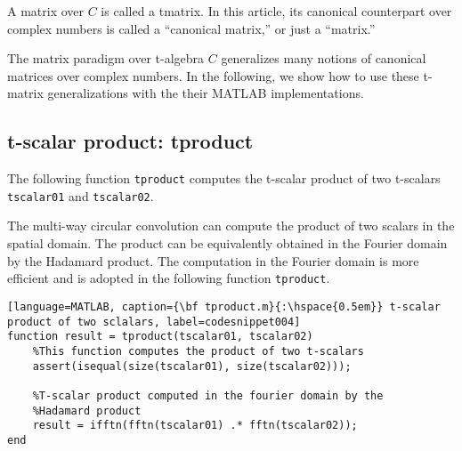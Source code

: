 \documentclass[12pt,reqno]{amsart}
\numberwithin{equation}{section}
\numberwithin{figure}{section}
\numberwithin{table}{section}
\theoremstyle{definition}
\begin{document}
\lstset{style=mystyle}

\renewcommand{\lstlistingname}{function}

A matrix over $C$ is called a tmatrix. In this article, its canonical counterpart over complex numbers is called a ``canonical matrix,'' or just a ``matrix.''  

The matrix paradigm over t-algebra $C$ generalizes many notions of canonical matrices over complex numbers. 
In the following, we show how to use these t-matrix generalizations with the their MATLAB implementations.


\subsection{{\color{blue}\sc t-scalar product}: {\color{blue}tproduct}}
The following function {\tt tproduct} computes the t-scalar product of two t-scalars {\tt tscalar01} and {\tt tscalar02}. 


The multi-way circular convolution can compute the product of two scalars in the spatial domain. The product can be equivalently obtained in the Fourier domain by the Hadamard product.  The computation in the Fourier domain is more efficient and is adopted in the following function 
{\tt tproduct}.  


\begin{lstlisting}[language=MATLAB, caption={\bf tproduct.m}{:\hspace{0.5em}} t-scalar product of two sclalars, label=codesnippet004] 
function result = tproduct(tscalar01, tscalar02)
	%This function computes the product of two t-scalars
	assert(isequal(size(tscalar01), size(tscalar02)));
	
	%T-scalar product computed in the fourier domain by the 
	%Hadamard product 
	result = ifftn(fftn(tscalar01) .* fftn(tscalar02));	
end
\end{lstlisting} 









\end{document}
